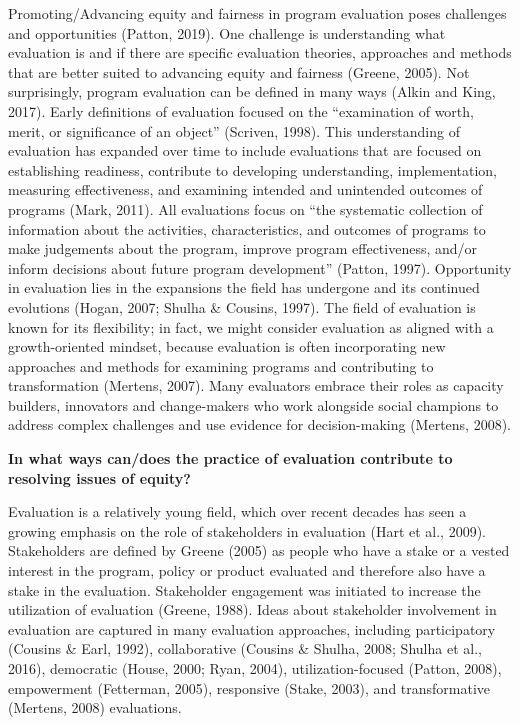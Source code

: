 \documentclass[
]{book}
\begin{document}
Promoting/Advancing equity and fairness in program evaluation poses challenges and opportunities (Patton, 2019). One challenge is understanding what evaluation is and if there are specific evaluation theories, approaches and methods that are better suited to advancing equity and fairness (Greene, 2005). Not surprisingly, program evaluation can be defined in many ways (Alkin and King, 2017). Early definitions of evaluation focused on the ``examination of worth, merit, or significance of an object'' (Scriven, 1998). This understanding of evaluation has expanded over time to include evaluations that are focused on establishing readiness, contribute to developing understanding, implementation, measuring effectiveness, and examining intended and unintended outcomes of programs (Mark, 2011). All evaluations focus on ``the systematic collection of information about the activities, characteristics, and outcomes of programs to make judgements about the program, improve program effectiveness, and/or inform decisions about future program development'' (Patton, 1997). Opportunity in evaluation lies in the expansions the field has undergone and its continued evolutions (Hogan, 2007; Shulha \& Cousins, 1997). The field of evaluation is known for its flexibility; in fact, we might consider evaluation as aligned with a growth-oriented mindset, because evaluation is often incorporating new approaches and methods for examining programs and contributing to transformation (Mertens, 2007). Many evaluators embrace their roles as capacity builders, innovators and change-makers who work alongside social champions to address complex challenges and use evidence for decision-making (Mertens, 2008).

\textbf{In what ways can/does the practice of evaluation contribute to resolving issues of equity?}

Evaluation is a relatively young field, which over recent decades has seen a growing emphasis on the role of stakeholders in evaluation (Hart et al., 2009). Stakeholders are defined by Greene (2005) as people who have a stake or a vested interest in the program, policy or product evaluated and therefore also have a stake in the evaluation. Stakeholder engagement was initiated to increase the utilization of evaluation (Greene, 1988). Ideas about stakeholder involvement in evaluation are captured in many evaluation approaches, including participatory (Cousins \& Earl, 1992), collaborative (Cousins \& Shulha, 2008; Shulha et al., 2016), democratic (House, 2000; Ryan, 2004), utilization-focused (Patton, 2008), empowerment (Fetterman, 2005), responsive (Stake, 2003), and transformative (Mertens, 2008) evaluations.
\end{document}
